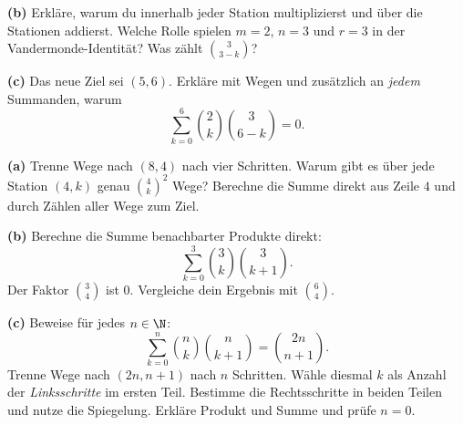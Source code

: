 \textbf{(b)} Erkläre, warum du innerhalb jeder Station multiplizierst
und über die Stationen addierst. Welche Rolle spielen $m=2$, $n=3$
und $r=3$ in der Vandermonde-Identität? Was zählt $\binom3{3-k}$?

\textbf{(c)} Das neue Ziel sei $(5,6)$. Erkläre mit Wegen und zusätzlich
an \emph{jedem} Summanden, warum
\[
 \sum_{k=0}^6\binom2k\binom3{6-k}=0.
\]

\textbf{(a)} Trenne Wege nach $(8,4)$ nach vier Schritten.
Warum gibt es über jede Station $(4,k)$ genau $\binom4k^2$ Wege?
Berechne die Summe direkt aus Zeile $4$ und durch Zählen aller Wege zum Ziel.

\textbf{(b)} Berechne die Summe benachbarter Produkte direkt:
\[
 \sum_{k=0}^3\binom3k\binom3{k+1}.
\]
Der Faktor $\binom34$ ist $0$. Vergleiche dein Ergebnis mit $\binom64$.

\textbf{(c)} Beweise für jedes $n\in\N$:
\[
 \boxed{\displaystyle
 \sum_{k=0}^n\binom nk\binom n{k+1}=\binom{2n}{n+1}.}
\]
Trenne Wege nach $(2n,n+1)$ nach $n$ Schritten. Wähle diesmal $k$
als Anzahl der \emph{Linksschritte} im ersten Teil. Bestimme die
Rechtsschritte in beiden Teilen und nutze die Spiegelung. Erkläre
Produkt und Summe und prüfe $n=0$.
